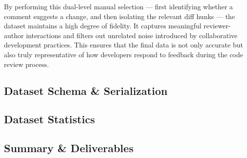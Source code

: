 By performing this dual-level manual selection — first identifying whether a comment suggests a
change, and then isolating the relevant diff hunks — the dataset maintains a high degree of
fidelity. It captures meaningful reviewer-author interactions and filters out unrelated noise
introduced by collaborative development practices. This ensures that the final data is not only
accurate but also truly representative of how developers respond to feedback during the code review
process.


\subsection{Dataset Schema \& Serialization}
\subsection{Dataset Statistics}
\subsection{Summary \& Deliverables}
